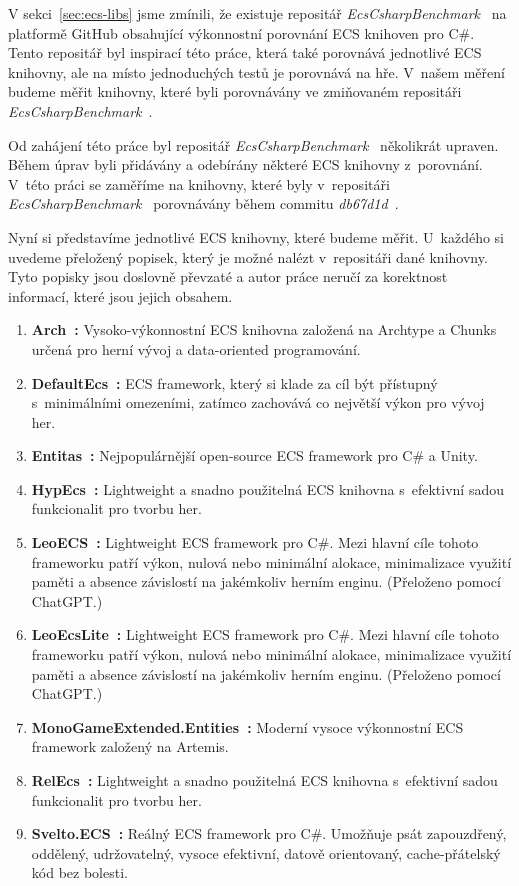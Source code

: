 V sekci~\ref{sec:ecs-libs} jsme zmínili, že existuje repositář \textit{EcsCsharpBenchmark}~\cite{EcsCsharpBenchmark} na platformě GitHub obsahující výkonnostní porovnání ECS knihoven pro C\#. Tento repositář byl inspirací této práce, která také porovnává jednotlivé ECS knihovny, ale na místo jednoduchých testů je porovnává na hře. V~našem měření budeme měřit knihovny, které byli porovnávány ve zmiňovaném repositáři \textit{EcsCsharpBenchmark}~\cite{EcsCsharpBenchmark}.

Od zahájení této práce byl repositář \textit{EcsCsharpBenchmark}~\cite{EcsCsharpBenchmark} několikrát upraven. Během úprav byli přidávány a odebírány některé ECS knihovny z~porovnání. V~této práci se zaměříme na knihovny, které byly v~repositáři \textit{EcsCsharpBenchmark}~\cite{EcsCsharpBenchmark} porovnávány během commitu \textit{db67d1d}~\cite{EcsCsharpBenchmarkCommit}.

Nyní si představíme jednotlivé ECS knihovny, které budeme měřit. U~každého si uvedeme přeložený popisek, který je možné nalézt v~repositáři dané knihovny. Tyto popisky jsou doslovně převzaté a autor práce neručí za korektnost informací, které jsou jejich obsahem.

\begin{enumerate}
    \item \textbf{Arch~\cite{Arch}:} Vysoko-výkonnostní ECS knihovna založená na Archtype a Chunks určená pro herní vývoj a data-oriented programování.
    \item \textbf{DefaultEcs~\cite{DefaultEcs}:} ECS framework, který si klade za cíl být přístupný s~minimálními omezeními, zatímco zachovává co největší výkon pro vývoj her.
    \item \textbf{Entitas~\cite{Entitas}:} Nejpopulárnější open-source ECS framework pro C\# a Unity.
    \item \textbf{HypEcs~\cite{HypEcs}:} Lightweight a snadno použitelná ECS knihovna s~efektivní sadou funkcionalit pro tvorbu her.
    \item \textbf{LeoECS~\cite{LeoECS}:} Lightweight ECS framework pro C\#. Mezi hlavní cíle tohoto frameworku patří výkon, nulová nebo minimální alokace, minimalizace využití paměti a absence závislostí na jakémkoliv herním enginu. (Přeloženo pomocí ChatGPT.)
    \item \textbf{LeoEcsLite~\cite{LeoEcsLite}:} Lightweight ECS framework pro C\#. Mezi hlavní cíle tohoto frameworku patří výkon, nulová nebo minimální alokace, minimalizace využití paměti a absence závislostí na jakémkoliv herním enginu. (Přeloženo pomocí ChatGPT.)
    \item \textbf{MonoGameExtended.Entities~\cite{MonoGameExtended}:} Moderní vysoce výkonnostní ECS framework založený na Artemis.
    \item \textbf{RelEcs~\cite{RelEcs}:} Lightweight a snadno použitelná ECS knihovna s~efektivní sadou funkcionalit pro tvorbu her.
    \item \textbf{Svelto.ECS~\cite{SveltoECS}:} Reálný ECS framework pro C\#. Umožňuje psát zapouzdřený, oddělený, udržovatelný, vysoce efektivní, datově orientovaný, cache-přátelský kód bez bolesti.
\end{enumerate}

